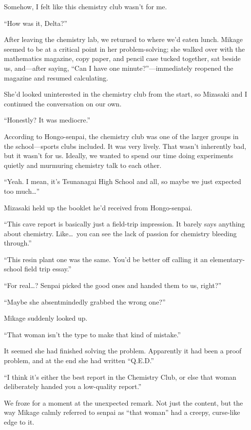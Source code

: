 \documentclass[
    a4paper,
    12pt,
    twoside,
    openany,
    UTF8,
    fontset=windows
]{ctexbook}
\begin{document}
Somehow, I felt like this chemistry club wasn't for me.

``How was it, Delta?''

After leaving the chemistry lab, we returned to where we'd eaten lunch. Mikage seemed to be at a critical point in her problem-solving; she walked over with the mathematics magazine, copy paper, and pencil case tucked together, sat beside us, and---after saying, ``Can I have one minute?''---immediately reopened the magazine and resumed calculating.

She'd looked uninterested in the chemistry club from the start, so Mizasaki and I continued the conversation on our own.

``Honestly? It was mediocre.''

According to Hongo-senpai, the chemistry club was one of the larger groups in the school---sports clubs included. It was very lively. That wasn't inherently bad, but it wasn't for us. Ideally, we wanted to spend our time doing experiments quietly and murmuring chemistry talk to each other.

``Yeah. I mean, it's Tsunanagai High School and all, so maybe we just expected too much\dots''

Mizasaki held up the booklet he'd received from Hongo-senpai.

``This cave report is basically just a field-trip impression. It barely says anything about chemistry. Like\dots\ you can see the lack of passion for chemistry bleeding through.''

``This resin plant one was the same. You'd be better off calling it an elementary-school field trip essay.''

``For real\dots? Senpai picked the good ones and handed them to us, right?''

``Maybe she absentmindedly grabbed the wrong one?''

Mikage suddenly looked up.

``That woman isn't the type to make that kind of mistake.''

It seemed she had finished solving the problem. Apparently it had been a proof problem, and at the end she had written ``Q.E.D.''

``I think it's either the best report in the Chemistry Club, or else that woman deliberately handed you a low-quality report.''

We froze for a moment at the unexpected remark. Not just the content, but the way Mikage calmly referred to senpai as ``that woman'' had a creepy, curse-like edge to it.
\end{document}
